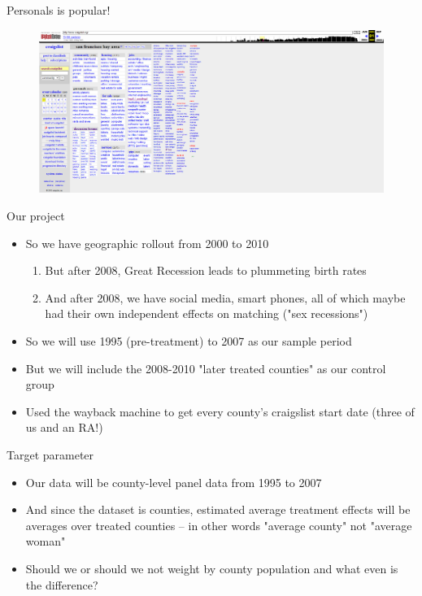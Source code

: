 \documentclass{beamer}
\begin{document}
\begin{frame}{Personals is popular!}
\begin{figure}
    \centering
    \includegraphics[height=0.85\textheight]{./lecture_includes/melanie8}
\end{figure}

\end{frame}


\begin{frame}{Our project}

\begin{itemize}
\item So we have geographic rollout from 2000 to 2010
	\begin{enumerate}
\item But after 2008, Great Recession leads to plummeting birth rates
\item And after 2008, we have social media, smart phones, all of which maybe had their own independent effects on matching ("sex recessions")
	\end{enumerate}
\item So we will use 1995 (pre-treatment) to 2007 as our sample period
\item But we will include the 2008-2010 "later treated counties" as our control group
\item Used the wayback machine to get every county's craigslist start date (three of us and an RA!)
\end{itemize}

\end{frame}

\begin{frame}{Target parameter}

\begin{itemize}
\item Our data will be county-level panel data from 1995 to 2007
\item And since the dataset is counties, estimated average treatment effects will be averages over treated counties -- in other words "average county" not "average woman"
\item Should we or should we not weight by county population and what even is the difference?
\end{itemize}

\end{frame}
\end{document}

